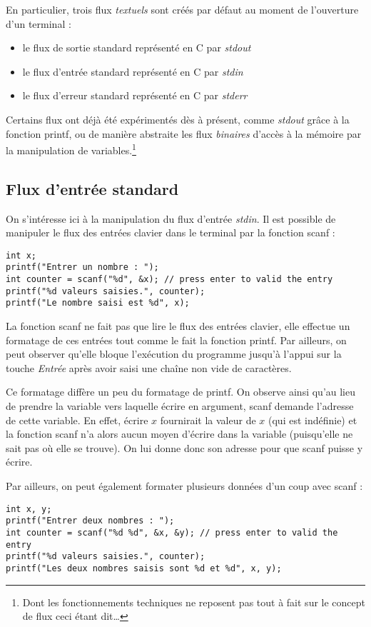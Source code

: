 \documentclass[../../../main.tex]{subfiles}
\begin{document}
En particulier, trois flux \textit{textuels} sont créés par défaut au moment de l'ouverture d'un terminal :
\begin{itemize}
	\item le flux de sortie standard représenté en C par \textit{stdout}
	\item le flux d'entrée standard représenté en C par \textit{stdin}
	\item le flux d'erreur standard représenté en C par \textit{stderr}
\end{itemize}
Certains flux ont déjà été expérimentés dès à présent, comme \textit{stdout} grâce à la fonction \textsf{printf}, ou de manière abstraite les flux \textit{binaires} d'accès à la mémoire par la manipulation de variables.\footnote{Dont les fonctionnements techniques ne reposent pas tout à fait sur le concept de flux ceci étant dit\dots }
 
\subsection{Flux d'entrée standard}
On s'intéresse ici à la manipulation du flux d'entrée \textit{stdin}. Il est possible de manipuler le flux des entrées clavier dans le terminal par la fonction \textsf{scanf} :
\begin{verbatim}
int x;
printf("Entrer un nombre : ");
int counter = scanf("%d", &x); // press enter to valid the entry
printf("%d valeurs saisies.", counter);
printf("Le nombre saisi est %d", x);
\end{verbatim}
La fonction \textsf{scanf} ne fait pas que lire le flux des entrées clavier, elle effectue un formatage de ces entrées tout comme le fait la fonction \textsf{printf}. Par ailleurs, on peut observer qu'elle bloque l'exécution du programme jusqu'à l'appui sur la touche \textit{Entrée} après avoir saisi une chaîne non vide de caractères.
 
Ce formatage diffère un peu du formatage de \textsf{printf}. On observe ainsi qu'au lieu de prendre la variable vers laquelle écrire en argument, \textsf{scanf} demande l'adresse de cette variable. En effet, écrire $x$ fournirait la valeur de $x$ (qui est indéfinie) et la fonction \textsf{scanf} n'a alors aucun moyen d'écrire dans la variable (puisqu'elle ne sait pas où elle se trouve). On lui donne donc son adresse pour que \textsf{scanf} puisse y écrire.
 
Par ailleurs, on peut également formater plusieurs données d'un coup avec \textsf{scanf} :
\begin{listing}[ht]
	\begin{verbatim}
int x, y;
printf("Entrer deux nombres : ");
int counter = scanf("%d %d", &x, &y); // press enter to valid the entry
printf("%d valeurs saisies.", counter);
printf("Les deux nombres saisis sont %d et %d", x, y);
	\end{verbatim}
	\label{lst:prgm1}
\end{listing}
\end{document}
